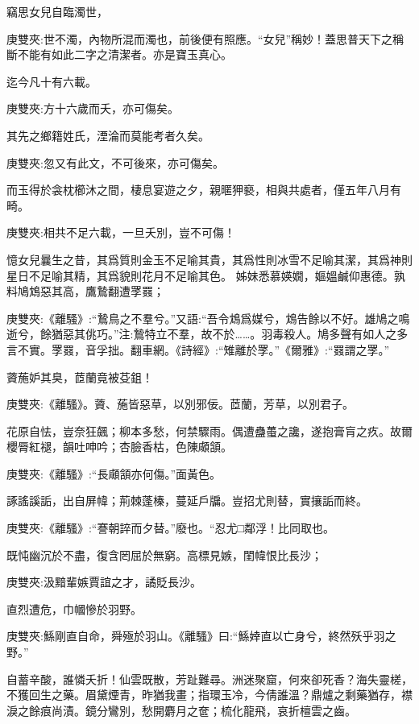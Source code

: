 \begin{qute2sp}
    \begin{parag}
        竊思女兒自臨濁世，
        \begin{note}庚雙夾:世不濁，內物所混而濁也，前後便有照應。“女兒”稱妙！蓋思普天下之稱斷不能有如此二字之清潔者。亦是寶玉真心。\end{note}
        迄今凡十有六載。
        \begin{note}庚雙夾:方十六歲而夭，亦可傷矣。\end{note}
        其先之鄉籍姓氏，湮淪而莫能考者久矣。
        \begin{note}庚雙夾:忽又有此文，不可後來，亦可傷矣。\end{note}
        而玉得於衾枕櫛沐之間，棲息宴遊之夕，親暱狎褻，相與共處者，僅五年八月有畸。
        \begin{note}庚雙夾:相共不足六載，一旦夭別，豈不可傷！\end{note}
        憶女兒曩生之昔，其爲質則金玉不足喻其貴，其爲性則冰雪不足喻其潔，其爲神則星日不足喻其精，其爲貌則花月不足喻其色。
        姊妹悉慕媖嫺，嫗媼鹹仰惠德。孰料鳩鴆惡其高，鷹鷙翻遭罦罬；
        \begin{note}庚雙夾:《離騷》:“鷙鳥之不羣兮。”又語:“吾令鴆爲媒兮，鴆告餘以不好。雄鳩之鳴逝兮，餘猶惡其佻巧。”注:鷙特立不羣，故不於……。羽毒殺人。鳩多聲有如人之多言不實。罦罬，音孚拙。翻車網。《詩經》:“雉離於罦。”《爾雅》:“罬謂之罦。”\end{note}
        薋葹妒其臭，茝蘭竟被芟鉏！
        \begin{note}庚雙夾:《離騷》。薋、葹皆惡草，以別邪佞。茝蘭，芳草，以別君子。\end{note}
        花原自怯，豈奈狂飆；柳本多愁，何禁驟雨。偶遭蠱蠆之讒，遂抱膏肓之疚。故爾櫻脣紅褪，韻吐呻吟；杏臉香枯，色陳顑頷。
        \begin{note}庚雙夾:《離騷》:“長顑頷亦何傷。”面黃色。\end{note}
        諑謠謑詬，出自屏幃；荊棘蓬榛，蔓延戶牖。豈招尤則替，實攘詬而終。
        \begin{note}庚雙夾:《離騷》:“謇朝誶而夕替。”廢也。“忍尤□鄰浮！比同取也。\end{note}
        既忳幽沉於不盡，復含罔屈於無窮。高標見嫉，閨幃恨比長沙；
        \begin{note}庚雙夾:汲黯輩嫉賈誼之才，譎貶長沙。\end{note}
        直烈遭危，巾幗慘於羽野。
        \begin{note}庚雙夾:鯀剛直自命，舜殛於羽山。《離騷》曰:“鯀婞直以亡身兮，終然殀乎羽之野。”\end{note}
        自蓄辛酸，誰憐夭折！仙雲既散，芳趾難尋。洲迷聚窟，何來卻死香？海失靈槎，不獲回生之藥。眉黛煙青，昨猶我畫；指環玉冷，今倩誰溫？鼎爐之剩藥猶存，襟淚之餘痕尚漬。鏡分鸞別，愁開麝月之奩；梳化龍飛，哀折檀雲之齒。

\end{parag}
\end{qute2sp}
